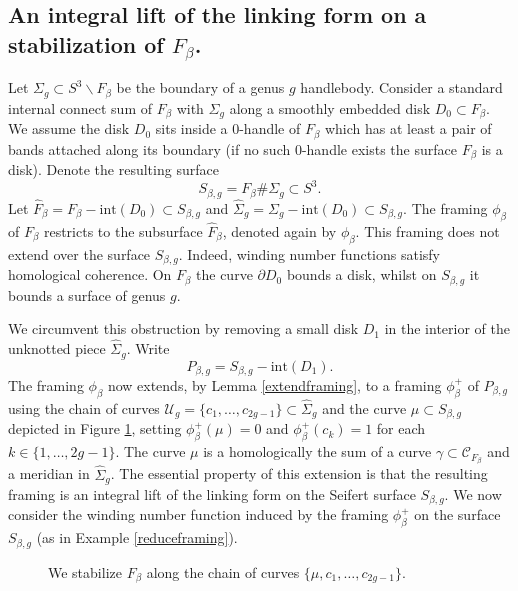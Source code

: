 \documentclass[10pt]{amsart}
\numberwithin{equation}{section}
\theoremstyle{plain}
\theoremstyle{definition}
\theoremstyle{remark}
\begin{document}
\subsection{An integral lift of the linking form on a stabilization of $F_\beta$.} \label{integralliftsection}{ Let $\Sigma_g \subset S^3 \backslash F_\beta$ be the boundary of a genus $g$ handlebody. Consider a standard internal connect sum of $F_\beta$ with $\Sigma_g$ along a smoothly embedded disk $D_0 \subset F_{\beta}$. We assume the disk $D_0$ sits inside a 0-handle of $F_\beta$ which has at least a pair of bands attached along its boundary (if no such 0-handle exists the surface $F_\beta$ is a disk). Denote the resulting surface \[S_{\beta,g} = F_\beta \# \Sigma_g \subset S^3.\] Let $\widehat{F}_\beta = F_\beta - \textrm{int}(D_0) \subset S_{\beta,g}$ and $\widehat{\Sigma}_g = \Sigma_g - \textrm{int}(D_0) \subset S_{\beta,g}$. The framing $\phi_{\beta}$ of $F_{\beta}$ restricts to the subsurface $\widehat{F}_\beta$, denoted again by $\phi_{\beta}$. This framing does not extend over the surface $S_{\beta,g}$. Indeed, winding number functions satisfy homological coherence. On $F_{\beta}$ the curve $\partial D_0$ bounds a disk, whilst on $S_{\beta,g}$ it bounds a surface of genus $g$.


We circumvent this obstruction by removing a small disk $D_1$ in the interior of the unknotted piece $\widehat{\Sigma}_g$. Write  \[P_{\beta,g} = S_{\beta,g} - \textrm{int}(D_1).\] The framing $\phi_\beta$ now extends, by Lemma \ref{extendframing}, to a framing $\phi_\beta^+$ of $P_{\beta,g}$ using the chain of curves $\mathcal{U}_g = \{c_1,\ldots,c_{2g-1}\} \subset \widehat{\Sigma}_g$ and the curve $\mu \subset S_{\beta,g}$ depicted in Figure \ref{stabilizingseifertsurface}, setting $\phi_\beta^+(\mu) = 0$ and $\phi_\beta^+(c_k) = 1$ for each $k \in \{1,\ldots,2g-1\}$. The curve $\mu$ is a homologically the sum of a curve $\gamma \subset \mathcal{C}_{F_\beta}$ and a meridian in $\widehat{\Sigma}_g$. The essential property of this extension is that the resulting framing is an integral lift of the linking form on the Seifert surface $S_{\beta,g}$. We now consider the winding number function induced by the framing $\phi^+_\beta$ on the surface $S_{\beta,g}$ (as in Example \ref{reduceframing}).  \label{SPFDefns}}




\begin{figure}
  \centering
  \def\svgwidth{0.85\columnwidth}
  
  \caption{\textnormal{We stabilize $F_\beta$ along the chain of curves $\{\mu,c_1,\ldots,c_{2g-1}\}$}. }
  \label{stabilizingseifertsurface}
\end{figure}
\end{document}
